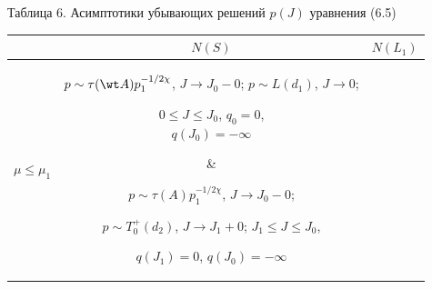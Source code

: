 \pagebreak


 





 


\begin{center} 


Таблица 6. Асимптотики убывающих решений $p(J)$ уравнения (6.5) 


\begin{tabular}{|l|c|c|} 


\hline 


\ & $N(S)$ & $N(L_1)$ \\ 


\hline 


$\mu\le\mu_1$ & \parbox{6.5cm}{$p\sim\tau(\wt A) 


p^{-1/2\chi}_1$, $J\to J_0-0$; $p\sim L(d_1)$, $J\to0$; 


$0\le J\le J_0$, $q_0=0$,\\ $q(J_0)=-\infty$} & 


\parbox{6.5cm}{$p\sim\tau(A)p^{-1/2\chi}_1$, $J\to J_0-0$; 


$p\sim T^+_0(d_2)$, $J\to J_1+0$; $J_1\le J\le J_0$, 


$q(J_1)=0$, $q(J_0)=-\infty$} \\ 


\hline 


$\mu_1<\mu<\mu_2$ & 


\parbox{6.5cm}{$p\sim(d_3p_1\sigma^{-1})^\lambda$, 


$J\to J_0-0$; $p\sim L(d_1)$, $J\to0$; $0\le J\le J_0$, 


$q_0=0$,\\ $q(J_0)=-\infty$} & 


\parbox{6.5cm}{$p\sim J_0J^{\sigma+k_1}$, $J\to\infty$; 


$p\sim T^+_0(d_2)$, $J\to J_1+0$; $J_1\le J<\infty$, 


$q(J_1){=}0$, $q(\infty){=}0$} \\ 


\hline 


$\mu=\mu_2$ & 


\parbox{6.5cm}{$p\sim\frac{(\beta p_1\lambda^{-1})^\lambda} 


{(\beta+1)^\sigma}$, $J\to J_0-0$; $p\sim K(\wt D)$, 


$J\to0$; $0\le J\le J_0$, $q_0=\wt D p^{-\varphi}_0<0$, 


$q(J_0)=-\infty$} & 



\end{tabular}
\end{center}
